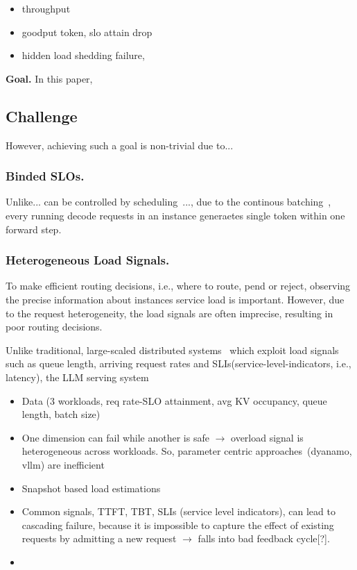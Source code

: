 \begin{itemize}
    \item throughput
    \item goodput token, slo attain drop
    \item hidden load shedding failure,
\end{itemize}


\noindent\textbf{Goal.} In this paper,

\subsection{Challenge}
However, achieving such a goal is non-trivial due to...
\subsubsection{Binded SLOs.} Unlike... can be controlled by scheduling~\cite{clockwork}..., due to the continous batching~\cite{Orca}, every running decode requests in an instance generaetes single token within one forward step.

\subsubsection{Heterogeneous Load Signals.} To make efficient routing decisions, i.e., where to route, pend or reject, observing the precise information about instances service load is important. However, due to the request heterogeneity, the load signals are often imprecise, resulting in poor routing decisions.

Unlike traditional, large-scaled distributed systems~\cite{Protego, Aequitas} which exploit load signals such as queue length, arriving request rates and SLIs(service-level-indicators, i.e., latency), the LLM serving system
\begin{itemize}
    \item Data (3 workloads, req rate-SLO attainment, avg KV occupancy, queue length, batch size)
    \item One dimension can fail while another is safe $\rightarrow$ overload signal is heterogeneous across workloads. So, parameter centric approaches~\cite{Llumnix, LMETRIC}(dyanamo, vllm) are inefficient
    \item Snapshot based load estimations
    \item Common signals, TTFT, TBT, SLIs (service level indicators), can lead to cascading failure, because it is impossible to capture the effect of existing requests by admitting a new request $\rightarrow$ falls into bad feedback cycle[?].
    \item {}
\end{itemize}

